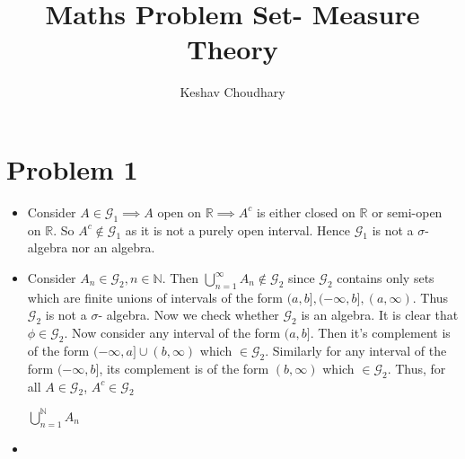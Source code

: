 \documentclass{article}
\title{Maths Problem Set- Measure Theory}
\author{Keshav Choudhary}
\begin{document}
  \maketitle

  \section*{Problem 1}
    \begin{itemize}

      \item Consider $A \in \mathcal{G}_1 \implies A$ open on $\mathbb{R}\implies {A}^c$
      is either closed on $\mathbb{R}$ or semi-open on $\mathbb{R}$. So ${A}^c \notin \mathcal{G}_1$
      as it is not a purely open interval. Hence $\mathcal{G}_1$ is not a $\sigma$- algebra nor an algebra.

      \item Consider $A_n \in \mathcal{G}_2, n \in \mathbb{N}$. Then $\bigcup_{n=1}^{\infty}A_n \notin \mathcal{G}_2$
      since $\mathcal{G}_2$ contains only sets which are finite unions of intervals of the form $(a, b], (-\infty, b], (a, \infty)$.
      Thus $\mathcal{G}_2$ is not a $\sigma$- algebra. Now we check whether $\mathcal{G}_2$  is an algebra.
      It is clear that $\phi \in \mathcal{G}_2$. Now consider any interval of the form $(a,b]$.
      Then it's complement is of the form $(-\infty,a] \cup (b, \infty)$ which $\in \mathcal{G}_2$. Similarly for any interval of the form
      $(-\infty, b]$, its complement is of the form $(b, \infty)$ which $\in \mathcal{G}_2$. Thus, for all $A \in \mathcal{G}_2$, ${A}^c \in \mathcal{G}_2$

      $\bigcup_{n=1}^{\mathbb{N}}A_{n}$    

      \item


    \end{itemize}
\end{document}
